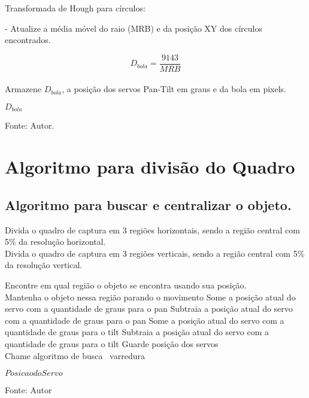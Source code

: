 \begin{algorithm}
{Transformada de Hough para círculos:

- Atualize a média móvel do raio (MRB) e da posição XY dos círculos encontrados.

\begin{equation} 
	D_{bola} = \frac {9143} {MRB}
\end{equation}\\

Armazene \(D_{bola}\), a posição dos servos Pan-Tilt em graus e da bola em pixels.
}

\Retorna \(D_{bola}\)

\caption[Algoritmo de rastreamento da bola - Círculos de Hough.]{Fonte: Autor.}
\label{lst:algBall}
\end{algorithm}


\chapter{Algoritmo para divisão do Quadro} \label{chap:apendiceDivQuadro}

\section{Algoritmo para buscar e centralizar o objeto.}
\begin{algorithm}

Divida o quadro de captura em 3 regiões horizontais, sendo a região central com 5\% da resolução horizontal.\\
Divida o quadro de captura em 3 regiões verticais, sendo a região central com 5\% da resolução vertical.\\
{
		{
		Encontre em qual região o objeto se encontra usando sua posição.\\
					{Mantenha o objeto nessa região parando o movimento}
					{Some a posição atual do servo com a quantidade de graus para o pan}
					{Subtraia a posição atual do servo com a quantidade de graus para o pan}
					{Some a posição atual do servo com a quantidade de graus para o tilt}
					{Subtraia a posição atual do servo com a quantidade de graus para o tilt}
		Guarde posição dos servos\\
		}
		\Senao
		{		
		Chame algoritmo de busca \ varredura
		}
	
}
\Retorna \(Posicao do Servo\)

\caption[Algoritmo para buscar e centralizar o objeto]{Fonte: Autor}
\label{lst:algCent}
\end{algorithm}



